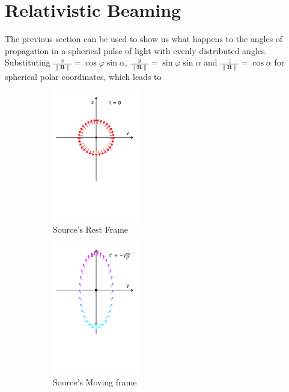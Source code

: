 \section{Relativistic Beaming} \label{sect: Relativistic Beaming}

The previous section can be used to show us what happens to the angles of propagation in a spherical pulse of light with evenly distributed angles.
Substituting $\frac{x}{\|\mathbf{R}\|} = \cos{\varphi}\sin{\alpha}$, $\frac{y}{\|\mathbf{R}\|} = \sin{\varphi}\sin{\alpha}$ and $ \frac{z}{\|\mathbf{R}\|} = \cos{\alpha}$ for spherical polar coordinates, which leads to

\begin{figure}[H]
	\begin{subfigure}{.32\textwidth}
		\centering
		\includegraphics[width = 3.8cm]{images/pdf/Rest_Pulse.pdf}
		\caption{Source's Rest Frame}
	\end{subfigure}
	\begin{subfigure}{.32\textwidth}
		\centering
		\includegraphics[width = 3.8cm]{images/pdf/Prime_Pulse.pdf}
		\caption{Source's Moving frame}
	\end{subfigure}
	\begin{subfigure}{.32\textwidth}
		\centering

\end{subfigure}
\end{figure}
